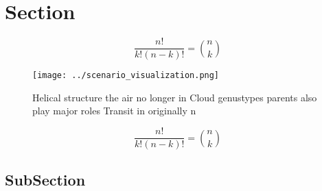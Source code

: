 \documentclass[a4paper]{article}
\begin{document}
\section{Section}

\[ \frac{n!}{k!(n-k)!} = \binom{n}{k} \]

\begin{figure}
\centering
\texttt{[image: ../scenario\_visualization.png]}
\caption{Helical structure the air no longer in Cloud genustypes parents also play major roles Transit in originally n
}
\end{figure}
 
\[ \frac{n!}{k!(n-k)!} = \binom{n}{k} \]

\subsection{SubSection}
\end{document}
